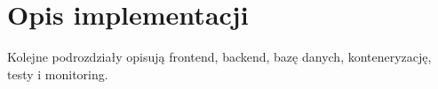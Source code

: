 \section{Opis implementacji}
\label{sec:implementacja}

Kolejne podrozdziały opisują frontend, backend, bazę danych, konteneryzację,
testy i monitoring.








